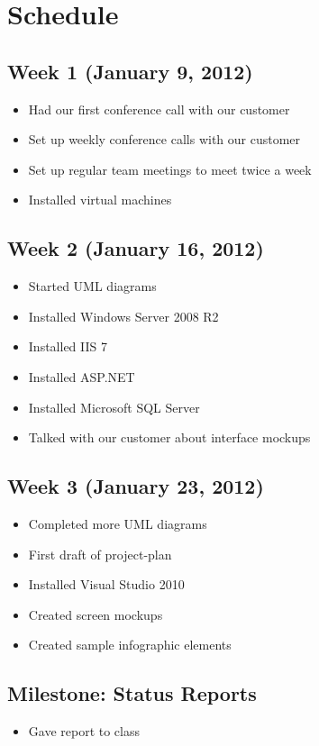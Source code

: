 \documentclass[11pt,a4paper,oneside]{article}
\begin{document}
\section{Schedule}

\subsection{Week 1 (January 9, 2012)}
\begin{itemize}
\item Had our first conference call with our customer
\item Set up weekly conference calls with our customer
\item Set up regular team meetings to meet twice a week
\item Installed virtual machines
\end{itemize}


\subsection{Week 2 (January 16, 2012)}
\begin{itemize}
\item Started UML diagrams
\item Installed Windows Server 2008 R2
\item Installed IIS 7
\item Installed ASP.NET
\item Installed Microsoft SQL Server
\item Talked with our customer about interface mockups
\end{itemize}

\subsection{Week 3 (January 23, 2012)}
\begin{itemize}
\item Completed more UML diagrams
\item First draft of project-plan
\item Installed Visual Studio 2010
\item Created screen mockups
\item Created sample infographic elements
\end{itemize}

\subsection{Milestone: Status Reports}
\begin{itemize}
\item Gave report to class
\end{itemize}
\end{document}
